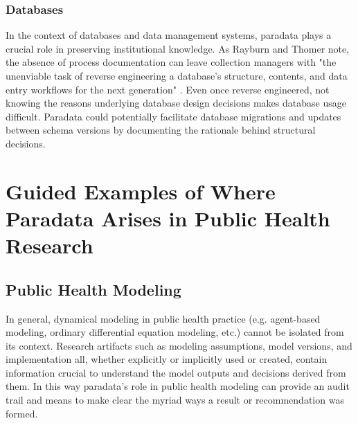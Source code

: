 \subsubsection{Databases}
In the context of databases and data management systems, paradata plays a crucial role in preserving institutional knowledge. As Rayburn and Thomer note, the absence of process documentation can leave collection managers with "the unenviable task of reverse engineering a database's structure, contents, and data entry workflows for the next generation" \cite{rayburn2024reconstructing}. Even once reverse engineered, not knowing the reasons underlying database design decisions makes database usage difficult. Paradata could potentially facilitate database migrations and updates between schema versions by documenting the rationale behind structural decisions.


\section{Guided Examples of Where Paradata Arises in Public Health Research }
\subsection{Public Health Modeling}
            
In general, dynamical modeling in public health practice (e.g. agent-based modeling, ordinary differential equation modeling, etc.) cannot be isolated from its context.
Research artifacts such as modeling assumptions, model versions, and implementation all, whether explicitly or implicitly used or created, contain information crucial to understand the model outputs and decisions derived from them.
In this way paradata's role in public health modeling can provide an audit trail and means to make clear the myriad ways a result or recommendation was formed.

